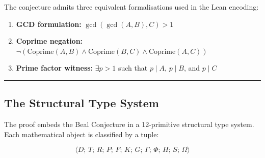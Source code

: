 \documentclass[12pt,a4paper]{article}
\begin{document}
The conjecture admits three equivalent formalisations used in the Lean encoding:

\begin{enumerate}
    \item \textbf{GCD formulation:} $\gcd(\gcd(A, B), C) > 1$
    \item \textbf{Coprime negation:} $\neg(\text{Coprime}(A,B) \wedge \text{Coprime}(B,C) \wedge \text{Coprime}(A,C))$
    \item \textbf{Prime factor witness:} $\exists p > 1$ such that $p \mid A$, $p \mid B$, and $p \mid C$
\end{enumerate}

\begin{center}
\rule{0.5\textwidth}{0.4pt}
\end{center}

\subsection{The Structural Type System}

The proof embeds the Beal Conjecture in a 12-primitive structural type system. Each mathematical object is classified by a tuple:

\[\langle D;\, T;\, R;\, P;\, F;\, K;\, G;\, \Gamma;\, \Phi;\, H;\, S;\, \Omega \rangle\]
\end{document}
